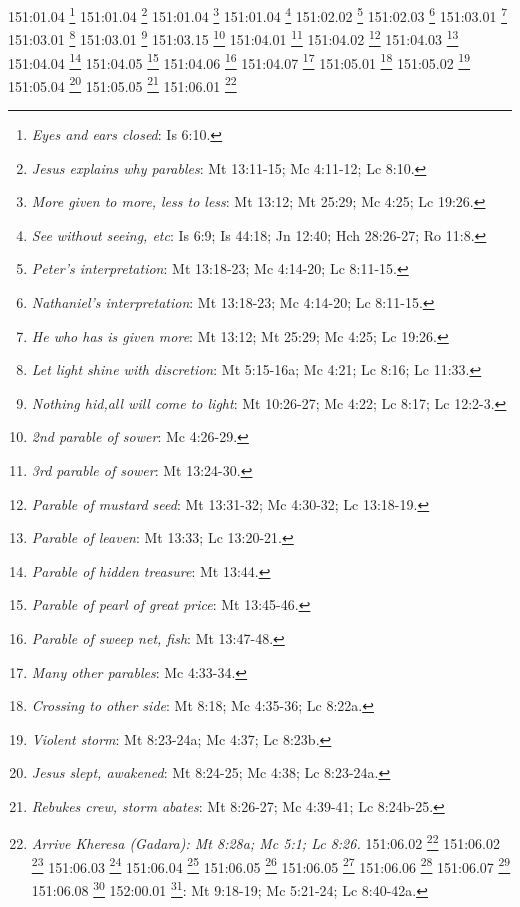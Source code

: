 {{{{{{{{{{{{{{{{{{{{{{{{{{{151:01.04 \footnote{\textit{Eyes and ears closed}: Is 6:10.}
151:01.04 \footnote{\textit{Jesus explains why parables}: Mt 13:11-15; Mc 4:11-12; Lc 8:10.}
151:01.04 \footnote{\textit{More given to more, less to less}: Mt 13:12; Mt 25:29; Mc 4:25; Lc 19:26.}
151:01.04 \footnote{\textit{See without seeing, etc}: Is 6:9; Is 44:18; Jn 12:40; Hch 28:26-27; Ro 11:8.}
151:02.02 \footnote{\textit{Peter's interpretation}: Mt 13:18-23; Mc 4:14-20; Lc 8:11-15.}
151:02.03 \footnote{\textit{Nathaniel's interpretation}: Mt 13:18-23; Mc 4:14-20; Lc 8:11-15.}
151:03.01 \footnote{\textit{He who has is given more}: Mt 13:12; Mt 25:29; Mc 4:25; Lc 19:26.}
151:03.01 \footnote{\textit{Let light shine with discretion}: Mt 5:15-16a; Mc 4:21; Lc 8:16; Lc 11:33.}
151:03.01 \footnote{\textit{Nothing hid,all will come to light}: Mt 10:26-27; Mc 4:22; Lc 8:17; Lc 12:2-3.}
151:03.15 \footnote{\textit{2nd parable of sower}: Mc 4:26-29.}
151:04.01 \footnote{\textit{3rd parable of sower}: Mt 13:24-30.}
151:04.02 \footnote{\textit{Parable of mustard seed}: Mt 13:31-32; Mc 4:30-32; Lc 13:18-19.}
151:04.03 \footnote{\textit{Parable of leaven}: Mt 13:33; Lc 13:20-21.}
151:04.04 \footnote{\textit{Parable of hidden treasure}: Mt 13:44.}
151:04.05 \footnote{\textit{Parable of pearl of great price}: Mt 13:45-46.}
151:04.06 \footnote{\textit{Parable of sweep net, fish}: Mt 13:47-48.}
151:04.07 \footnote{\textit{Many other parables}: Mc 4:33-34.}
151:05.01 \footnote{\textit{Crossing to other side}: Mt 8:18; Mc 4:35-36; Lc 8:22a.}
151:05.02 \footnote{\textit{Violent storm}: Mt 8:23-24a; Mc 4:37; Lc 8:23b.}
151:05.04 \footnote{\textit{Jesus slept, awakened}: Mt 8:24-25; Mc 4:38; Lc 8:23-24a.}
151:05.05 \footnote{\textit{Rebukes crew, storm abates}: Mt 8:26-27; Mc 4:39-41; Lc 8:24b-25.}
151:06.01 \footnote{\textit{Arrive Kheresa (Gadara): Mt 8:28a; Mc 5:1; Lc 8:26.}
151:06.02 \footnote{\textit{Lunatic at large}: Mt 8:28b; Mc 5:2-3; Lc 8:27.}
151:06.02 \footnote{\textit{Lunatic broke shackles}: Mc 5:4; Lc 8:29b.}
151:06.03 \footnote{\textit{Lunatic's antics}: Mc 5:5.}
151:06.04 \footnote{\textit{Lunatic recognizes Jesus}: Mt 8:29; Mc 5:6-7; Lc 8:28.}
151:06.05 \footnote{\textit{Jesus "heals" lunatic}: Mt 8:32a; Mc 5:8; Lc 8:29a.}
151:06.05 \footnote{\textit{Lunatic cured}: Mc 5:15; Lc 8:35.}
151:06.06 \footnote{\textit{Legend about pigs}: Mt 8:30-33; Mc 5:11-16; Lc 8:33-34.}
151:06.07 \footnote{\textit{Local response}: Mt 8:34; Mc 5:16-17; Lc 8:36-37.}
151:06.08 \footnote{\textit{Fate of lunatic}: Mc 5:18-20; Lc 8:38-39.}
152:00.01 \footnote{\textit{Jairus' request}: heal daughter}: Mt 9:18-19; Mc 5:21-24; Lc 8:40-42a.}
}}}}}}}}}}}}}}}}}}}}}}}}}}}
